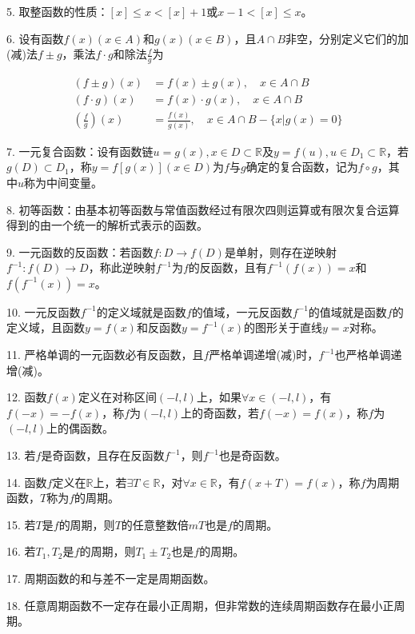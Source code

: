 \documentclass[UTF8]{ctexart}
\theoremstyle{remark}
\begin{document}
	5. 取整函数的性质：\([x]\leq x < [x]+1\)或\(x - 1 < [x]\leq x\)。
	
	6. 设有函数\(f(x)(x\in A)\)和\(g(x)(x\in B)\)，且\(A\cap B\)非空，分别定义它们的加(减)法\(f\pm g\)，乘法\(f\cdot g\)和除法\(\frac{f}{g}\)为
	
	\begin{align*}
	(f\pm g)(x)&=f(x)\pm g(x),\quad x\in A\cap B\\
	(f\cdot g)(x)&=f(x)\cdot g(x),\quad x\in A\cap B\\
	\left(\frac{f}{g}\right)(x)&=\frac{f(x)}{g(x)},\quad x\in A\cap B-\{x|g(x)=0\}
	\end{align*}
	
	7. 一元复合函数：设有函数链\(u = g(x),x\in D\subset\mathbb{R}\)及\(y = f(u),u\in D_1\subset\mathbb{R}\)，若\(g(D)\subset D_1\)，称\(y = f[g(x)](x\in D)\)为\(f\)与\(g\)确定的复合函数，记为\(f\circ g\)，其中\(u\)称为中间变量。
	
	8. 初等函数：由基本初等函数与常值函数经过有限次四则运算或有限次复合运算得到的由一个统一的解析式表示的函数。
	
	9. 一元函数的反函数：若函数\(f:D\rightarrow f(D)\)是单射，则存在逆映射\(f^{-1}:f(D)\rightarrow D\)，称此逆映射\(f^{-1}\)为\(f\)的反函数，且有\(f^{-1}(f(x)) = x\)和\(f(f^{-1}(x)) = x\)。
	
	10. 一元反函数\(f^{-1}\)的定义域就是函数\(f\)的值域，一元反函数\(f^{-1}\)的值域就是函数\(f\)的定义域，且函数\(y = f(x)\)和反函数\(y = f^{-1}(x)\)的图形关于直线\(y = x\)对称。
	
	11. 严格单调的一元函数必有反函数，且\(f\)严格单调递增(减)时，\(f^{-1}\)也严格单调递增(减)。
	
	12. 函数\(f(x)\)定义在对称区间\((-l,l)\)上，如果\(\forall x\in(-l,l)\)，有\(f(-x)=-f(x)\)，称\(f\)为\((-l,l)\)上的奇函数，若\(f(-x)=f(x)\)，称\(f\)为\((-l,l)\)上的偶函数。
	
	13. 若\(f\)是奇函数，且存在反函数\(f^{-1}\)，则\(f^{-1}\)也是奇函数。
	
	14. 函数\(f\)定义在\(\mathbb{R}\)上，若\(\exists T\in\mathbb{R}\)，对\(\forall x\in\mathbb{R}\)，有\(f(x + T)=f(x)\)，称\(f\)为周期函数，\(T\)称为\(f\)的周期。
	
	15. 若\(T\)是\(f\)的周期，则\(T\)的任意整数倍\(mT\)也是\(f\)的周期。
	
	16. 若\(T_1,T_2\)是\(f\)的周期，则\(T_1\pm T_2\)也是\(f\)的周期。
	
	17. 周期函数的和与差不一定是周期函数。
	
	18. 任意周期函数不一定存在最小正周期，但非常数的连续周期函数存在最小正周期。
	
\end{document}
